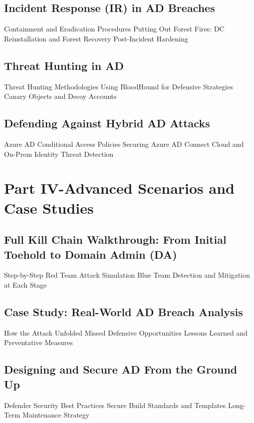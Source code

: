 \documentclass{article}
\begin{document}
\subsection{Incident Response (IR) in AD Breaches}
Containment and Eradication Procedures
Putting Out Forest Fires: DC Reinstallation and Forest Recovery
Post-Incident Hardening

\subsection{Threat Hunting in AD}
Threat Hunting Methodologies
Using BloodHound for Defensive Strategies
Canary Objects and Decoy Accounts

\subsection{Defending Against Hybrid AD Attacks}
Azure AD Conditional Access Policies
Securing Azure AD Connect
Cloud and On-Prem Identity Threat Detection

\section{Part IV-Advanced Scenarios and Case Studies}
\subsection{Full Kill Chain Walkthrough: From Initial Toehold to Domain Admin (DA)}

Step-by-Step Red Team Attack Simulation
Blue Team Detection and Mitigation at Each Stage

\subsection{Case Study: Real-World AD Breach Analysis}
How the Attack Unfolded
Missed Defensive Opportunities
Lessons Learned and Preventative Measures

\subsection{Designing and Secure AD From the Ground Up}
Defender Security Best Practices
Secure Build Standards and Templates
Long-Term Maintenance Strategy
\end{document}
